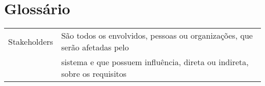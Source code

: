 \chapter*{Gloss\'{a}rio}

\begin{tabular}{ll}
Stakeholders &  S\~{a}o todos os envolvidos, pessoas ou organiza\c{c}\~{o}es, que ser\~{a}o afetadas pelo\\
             &  sistema e que possuem influ\^{e}ncia, direta ou indireta, sobre os requisitos
\end{tabular}
